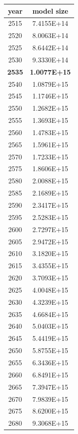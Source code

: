 \documentclass[a4paper]{article}
\begin{document}
    \begin{tabular}{| c | c |}
    	\hline
    	year & model size \\\hline
    	2515 & 7.4155E+14 \\\hline
    	2520 & 8.0063E+14 \\\hline
    	2525 & 8.6442E+14 \\\hline
    	2530 & 9.3330E+14 \\\hline
    	\textbf{2535} & \textbf{1.0077E+15} \\\hline
    	2540 & 1.0879E+15 \\\hline
    	2545 & 1.1746E+15 \\\hline
    	2550 & 1.2682E+15 \\\hline
    	2555 & 1.3693E+15 \\\hline
    	2560 & 1.4783E+15 \\\hline
    	2565 & 1.5961E+15 \\\hline
    	2570 & 1.7233E+15 \\\hline
    	2575 & 1.8606E+15 \\\hline
    	2580 & 2.0088E+15 \\\hline
    	2585 & 2.1689E+15 \\\hline
    	2590 & 2.3417E+15 \\\hline
    	2595 & 2.5283E+15 \\\hline
    	2600 & 2.7297E+15 \\\hline
    	2605 & 2.9472E+15 \\\hline
    	2610 & 3.1820E+15 \\\hline
    	2615 & 3.4355E+15 \\\hline
    	2620 & 3.7093E+15 \\\hline
    	2625 & 4.0048E+15 \\\hline
    	2630 & 4.3239E+15 \\\hline
    	2635 & 4.6684E+15 \\\hline
    	2640 & 5.0403E+15 \\\hline
    	2645 & 5.4419E+15 \\\hline
    	2650 & 5.8755E+15 \\\hline
    	2655 & 6.3436E+15 \\\hline
    	2660 & 6.8491E+15 \\\hline
    	2665 & 7.3947E+15 \\\hline
    	2670 & 7.9839E+15 \\\hline
    	2675 & 8.6200E+15 \\\hline
    	2680 & 9.3068E+15 \\\hline

\end{tabular}
\end{document}
